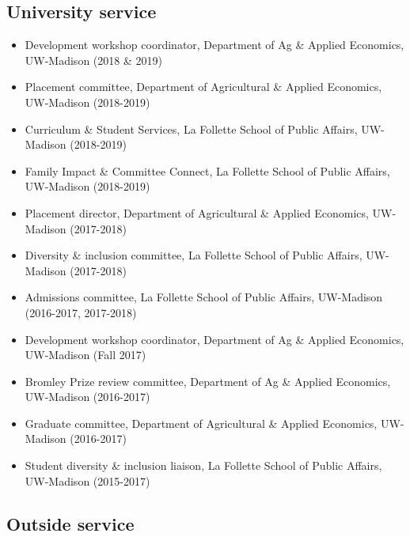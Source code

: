 \documentclass[11pt]{article}
\begin{document}
\subsection*{\sc University service}
\begin{itemize}[leftmargin=20pt]
    \itemsep-.1cm
    \item[] Development workshop coordinator, Department of Ag \& Applied Economics, UW-Madison (2018 \& 2019)
    \item[] Placement committee, Department of Agricultural \& Applied Economics, UW-Madison (2018-2019)
    \item[] Curriculum \& Student Services, La Follette School of Public Affairs, UW-Madison (2018-2019)
    \item[] Family Impact \& Committee Connect, La Follette School of Public Affairs, UW-Madison (2018-2019)
    \item[] Placement director, Department of Agricultural \& Applied Economics, UW-Madison (2017-2018)
    \item[] Diversity \& inclusion committee, La Follette School of Public Affairs, UW-Madison (2017-2018)
    \item[] Admissions committee, La Follette School of Public Affairs, UW-Madison (2016-2017, 2017-2018)
    \item[] Development workshop coordinator, Department of Ag \& Applied Economics, UW-Madison (Fall 2017)
    \item[] Bromley Prize review committee, Department of Ag \& Applied Economics, UW-Madison (2016-2017)
    \item[] Graduate committee, Department of Agricultural \& Applied Economics, UW-Madison (2016-2017)
    \item[] Student diversity \& inclusion liaison, La Follette School of Public Affairs, UW-Madison (2015-2017)
\end{itemize}

\subsection*{\sc Outside service}
\end{document}
